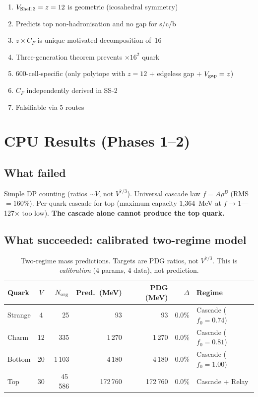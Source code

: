 \documentclass[11pt,letterpaper]{article}
\newcommand{\Norg}{N_{\rm org}}
\begin{document}
\begin{enumerate}
\item $V_{\rm Shell\,3} = z = 12$ is geometric (icosahedral
  symmetry) \checkmark
\item Predicts top non-hadronisation and no gap for s/c/b
  \checkmark
\item $z \times C_F$ is unique motivated decomposition of~16
  \checkmark
\item Three-generation theorem prevents $\times 16^2$ quark
  \checkmark
\item 600-cell-specific (only polytope with $z = 12$ + edgeless
  gap + $V_{\rm gap} = z$) \checkmark
\item $C_F$ independently derived in SS-2 \checkmark
\item Falsifiable via 5 routes \checkmark
\end{enumerate}

\section{CPU Results (Phases 1--2)}
\label{sec:results}

\subsection{What failed}

Simple DP counting (ratios $\sim V$, not $V^{7/3}$).  Universal
cascade law $f = A\rho^B$ (RMS~$= 160\%$).  Per-quark cascade
for top (maximum capacity 1,364~MeV at $f \to 1$---127$\times$
too low).  \textbf{The cascade alone cannot produce the top
quark.}

\subsection{What succeeded: calibrated two-regime model}

\begin{table}[H]
\centering
\caption{Two-regime mass predictions.  Targets are PDG ratios,
not $V^{7/3}$.  This is \emph{calibration} (4 params, 4 data),
not prediction.}
\label{tab:masses}
\begin{tabular}{@{}lcrrrrl@{}}
\toprule
Quark & $V$ & $\Norg$ & Pred.\ (MeV) & PDG (MeV)
  & $\Delta$ & Regime \\
\midrule
Strange & 4  &    25 &     93 &    93 & $0.0\%$
  & Cascade ($f_0 = 0.74$) \\
Charm   & 12 &   335 &  1\,270  & 1\,270  & $0.0\%$
  & Cascade ($f_0 = 0.81$) \\
Bottom  & 20 & 1\,103  &  4\,180  & 4\,180  & $0.0\%$
  & Cascade ($f_0 = 1.00$) \\
Top     & 30 & 45\,586 & 172\,760 & 172\,760 & $0.0\%$
  & Cascade + Relay \\
\bottomrule
\end{tabular}
\end{table}
\end{document}
